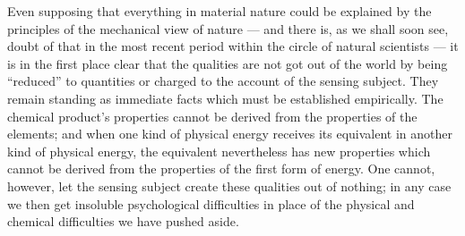 \documentclass[12pt,a4paper]{book}
\newcommand{\opage}[1]{\marginnote{\footnotesize\textit{[#1]}}}
\begin{document}
Even supposing that everything in material nature \opage{40}could be explained by the
principles of the mechanical view of nature --- and there is, as we shall soon
see, doubt of that in the most recent period within the circle of natural
scientists --- it is in the first place clear that the qualities are not got out
of the world by being ``reduced'' to quantities or charged to the account of the
sensing subject. They remain standing as immediate facts which must be
established empirically. The chemical product's properties cannot be derived
from the properties of the elements; and when one kind of physical energy
receives its equivalent in another kind of physical energy, the equivalent
nevertheless has new properties which cannot be derived from the properties of
the first form of energy. One cannot, however, let the sensing subject create
these qualities out of nothing; in any case we then get insoluble psychological
difficulties in place of the physical and chemical difficulties we have pushed
aside.
\end{document}
